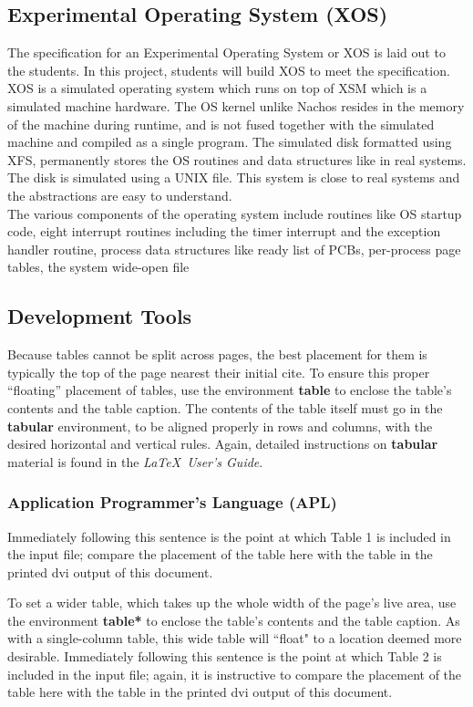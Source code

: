 \documentclass{sig-alternate}
\begin{document}
\subsection{Experimental Operating System (XOS)}
The specification for an Experimental Operating System or XOS is laid out to the students. In this project, students will build XOS to meet the specification. XOS is a simulated operating system which runs on top of XSM which is a simulated machine hardware. The OS kernel unlike Nachos \cite{nachos} resides in the memory of the machine during runtime, and is not fused together with the simulated machine and compiled as a single program. The simulated disk formatted using XFS, permanently stores the OS routines and data structures like in real systems. The disk is simulated using a UNIX file. This system is close to real systems and the abstractions are easy to understand. \\

The various components of the operating system include routines like OS startup code, eight interrupt routines including the timer interrupt and the  exception handler routine, process data structures like ready list of PCBs, per-process page tables, the system wide-open file 

\subsection{Development Tools}
Because tables cannot be split across pages, the best
placement for them is typically the top of the page
nearest their initial cite.  To
ensure this proper ``floating'' placement of tables, use the
environment \textbf{table} to enclose the table's contents and
the table caption.  The contents of the table itself must go
in the \textbf{tabular} environment, to
be aligned properly in rows and columns, with the desired
horizontal and vertical rules.  Again, detailed instructions
on \textbf{tabular} material
is found in the \textit{\LaTeX\ User's Guide}.



\subsubsection{Application Programmer's Language (APL)}
Immediately following this sentence is the point at which
Table 1 is included in the input file; compare the
placement of the table here with the table in the printed
dvi output of this document.

To set a wider table, which takes up the whole width of
the page's live area, use the environment
\textbf{table*} to enclose the table's contents and
the table caption.  As with a single-column table, this wide
table will ``float" to a location deemed more desirable.
Immediately following this sentence is the point at which
Table 2 is included in the input file; again, it is
instructive to compare the placement of the
table here with the table in the printed dvi
output of this document.
\end{document}
